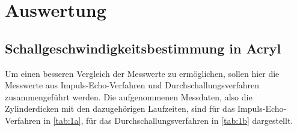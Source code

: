 \section{Auswertung}
\label{sec:auswertung}

\subsection{Schallgeschwindigkeitsbestimmung in Acryl}

Um einen besseren Vergleich der Messwerte zu ermöglichen, sollen hier die Messwerte aus Impuls-Echo-Verfahren und Durchschallungsverfahren zusammengeführt werden.
Die aufgenommenen Messdaten, also die Zylinderdicken mit den dazugehörigen Laufzeiten, sind für das Impuls-Echo-Verfahren in \autoref{tab:1a}, für das Durchschallungsverfahren in \autoref{tab:1b} dargestellt.

